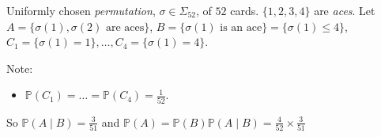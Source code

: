 \begin{example}
    Uniformly chosen \emph{permutation}, $\sigma \in \Sigma_{52}$, of $52$ cards.
    $\{1, 2, 3, 4\}$ are \emph{aces}.
    Let $A = \{\sigma(1), \sigma(2) \text{ are aces}\}$, $B = \{\sigma(1) \text{ is an ace}\} = \{\sigma(1) \leq 4\}$, $C_1 = \{\sigma(1) = 1\}, \dots, C_4 = \{\sigma(1) = 4\}$.

    Note:
    \begin{itemize}
        \mathitem \begin{align*}
            \mathbb{P}(A \mid C_i) &= \mathbb{P}(\sigma(2) \in \{1, 2, 3, 4\} \mid \sigma(1) = i) \quad i \leq 4 \\
            &= \frac{3}{51} \text{ by \Cref{exm:conditional}}
        \end{align*} 
        \item $\mathbb{P}(C_1) = \dots = \mathbb{P}(C_4) = \frac{1}{52}$.
    \end{itemize} 
    So $\mathbb{P}(A \mid B) = \frac{3}{51}$ and $\mathbb{P}(A) = \mathbb{P}(B) \mathbb{P}(A \mid B) = \frac{4}{52} \times \frac{3}{51}$
\end{example}